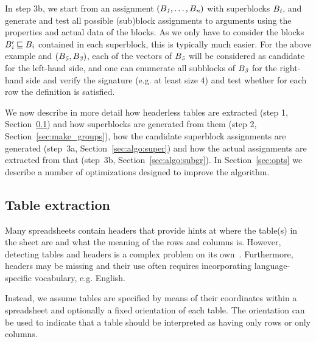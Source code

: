 In step 3b, we start from an assignment $(B_{\textit{1}}, \ldots, B_{\textit{n}})$ with superblocks $B_{\textit{i}}$, and generate and test all possible (sub)block assignments to arguments using the properties and actual data of the blocks. As we only have to consider the blocks $B'_{\textit{i}} \sqsubseteq B_{\textit{i}}$ contained in each superblock, this is typically much easier. For the above example and $(B_{\textit{5}}, B_{\textit{3}})$, each of the vectors of $B_{\textit{5}}$ will be considered as candidate for the left-hand side, and one can enumerate all subblocks of $B_{\textit{3}}$ for the right-hand side and verify the signature (e.g. at least size $4$) and test whether for each row the definition is satisfied. %

We now describe in more detail how headerless tables are extracted (step 1, Section~\ref{sec:table_extraction}) and how superblocks are generated from them (step 2, Section~\ref{sec:make_groups}), how the candidate superblock assignments are generated (step~3a, Section~\ref{sec:algo:super}) and how the actual assignments are extracted from that (step~3b, Section~\ref{sec:algo:subgr}).
In Section~\ref{sec:opts} we describe a number of optimizations designed to improve the algorithm.





\subsection{Table extraction}
\label{sec:table_extraction}
Many spreadsheets contain headers that provide hints at where the table(s) in the sheet are and what the meaning of the rows and columns is. However, detecting tables and headers is a complex problem on its own~\cite{header}. Furthermore, headers may be missing and their use often requires incorporating language-specific vocabulary, e.g. English.


Instead, we assume tables are specified by means of their coordinates within a spreadsheet and optionally a fixed orientation of each table. The orientation can be used to indicate that a table should be interpreted as having only rows or only columns.

